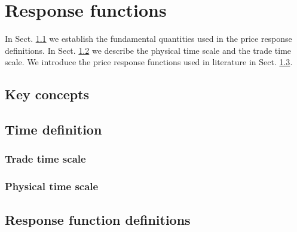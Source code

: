 \section{Response functions}\label{sec:response_functions_def}

In Sect. \ref{subsec:key_concepts} we establish the fundamental quantities used
in the price response definitions. In Sect. \ref{subsec:time_definition} we
describe the physical time scale and the trade time scale. We introduce the
price response functions used in literature in Sect. \ref{subsec:response_def}.

\subsection{Key concepts}\label{subsec:key_concepts}

\subsection{Time definition}\label{subsec:time_definition}

\subsubsection{Trade time scale}\label{subsubsec:trade_time}

\subsubsection{Physical time scale}\label{subsubsec:physical_time}

\subsection{Response function definitions}\label{subsec:response_def}